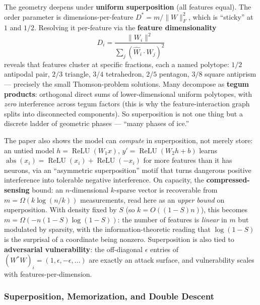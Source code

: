 The geometry deepens under \textbf{uniform superposition} (all features equal). The order parameter is dimensions-per-feature $D^{*} = m/\lVert W\rVert_F^2$, which is ``sticky'' at $1$ and $1/2$. Resolving it per-feature via the \textbf{feature dimensionality}
\[
  D_i = \frac{\lVert W_i\rVert^2}{\sum_j (\hat W_i \cdot W_j)^2}
\]
reveals that features cluster at specific fractions, each a named polytope: $1/2$ antipodal pair, $2/3$ triangle, $3/4$ tetrahedron, $2/5$ pentagon, $3/8$ square antiprism --- precisely the small Thomson-problem solutions. Many decompose as \textbf{tegum products}: orthogonal direct sums of lower-dimensional uniform polytopes, with \emph{zero} interference across tegum factors (this is why the feature-interaction graph splits into disconnected components). So superposition is not one thing but a discrete ladder of geometric phases --- ``many phases of ice.''

The paper also shows the model can \emph{compute} in superposition, not merely store: an untied model $h = \operatorname{ReLU}(W_1 x)$, $y' = \operatorname{ReLU}(W_2 h + b)$ learns $\operatorname{abs}(x_i) = \operatorname{ReLU}(x_i)+\operatorname{ReLU}(-x_i)$ for more features than it has neurons, via an ``asymmetric superposition'' motif that turns dangerous positive interference into tolerable negative interference. On capacity, the \textbf{compressed-sensing} bound: an $n$-dimensional $k$-sparse vector is recoverable from $m = \Omega(k\log(n/k))$ measurements, read here as an \emph{upper bound} on superposition. With density fixed by $S$ (so $k = O((1-S)n)$), this becomes $m = \Omega(-n(1-S)\log(1-S))$: the number of features is \emph{linear} in $m$ but modulated by sparsity, with the information-theoretic reading that $\log(1-S)$ is the surprisal of a coordinate being nonzero. Superposition is also tied to \textbf{adversarial vulnerability}: the off-diagonal $\epsilon$ entries of $(W^{*}W)_i = (1,\epsilon,-\epsilon,\dots)$ are exactly an attack surface, and vulnerability scales with features-per-dimension.

\subsubsection*{Superposition, Memorization, and Double Descent}

